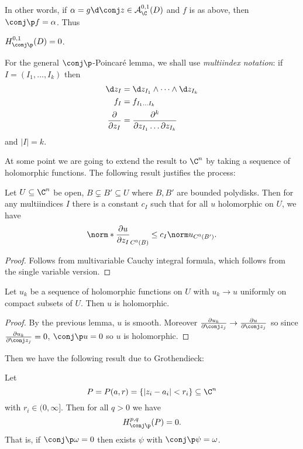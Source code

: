 \documentclass[a4paper]{article}
\newcommand{\w}{\wedge} %
\begin{document}
In other words, if \(\alpha = g \d \conj z \in \mathcal A_\C^{0, 1}(D)\) and \(f\) is as above, then \(\conj \p f = \alpha\). Thus

\begin{corollary}
  \(H^{0, 1}_{\conj \p}(D) = 0\).
\end{corollary}

For the general \(\conj \p\)-Poincaré lemma, we shall use \emph{multiindex notation}: if \(I = (I_1, \dots, I_k)\) then
\begin{align*}
  \d z_I &= \d z_{I_1} \w \dots \w \d z_{I_k} \\
  f_I &= f_{I_1 \dots I_k} \\
  \frac{\partial  }{\partial z_I} &= \frac{\partial^k }{\partial z_{I_1} \dots \partial z_{I_k}}
\end{align*}
and \(|I| = k\).

At some point we are going to extend the result to \(\C^n\) by taking a sequence of holomorphic functions. The following result justifies the process:

\begin{lemma}
  Let \(U \subseteq \C^n\) be open, \(B \subsetneq B' \subseteq U\) where \(B, B'\) are bounded polydisks. Then for any multiindices \(I\) there is a constant \(c_I\) such that for all \(u\) holomorphic on \(U\), we have
  \[
    \norm*{\frac{\partial u}{\partial z_I}}_{C^0(B)} \leq c_I \norm u_{C^0(B')}.
  \]
\end{lemma}

\begin{proof}
  Follows from multivariable Cauchy integral formula, which follows from the single variable version.
\end{proof}

\begin{corollary}
  Let \(u_k\) be a sequence of holomorphic functions on \(U\) with \(u_k \to u\) uniformly on compact subsets of \(U\). Then \(u\) is holomorphic.
\end{corollary}

\begin{proof}
  By the previous lemma, \(u\) is smooth. Moreover \(\frac{\partial u_k}{\partial \conj z_j} \to \frac{\partial u}{\partial \conj z_j}\) so since \(\frac{\partial u_k}{\partial \conj z_j} = 0\), \(\conj \p u = 0\) so \(u\) is holomorphic.
\end{proof}

Then we have the following result due to Grothendieck:

\begin{theorem}
  Let
  \[
    P = P(a, r) = \{|z_i - a_i| < r_i\} \subseteq \C^n
  \]
  with \(r_i \in (0, \infty]\). Then for all \(q > 0\) we have
  \[
    H_{\conj \p}^{p, q}(P) = 0.
  \]
  That is, if \(\conj \p \omega = 0\) then exists \(\psi\) with \(\conj \p \psi = \omega\).
\end{theorem}
\end{document}
